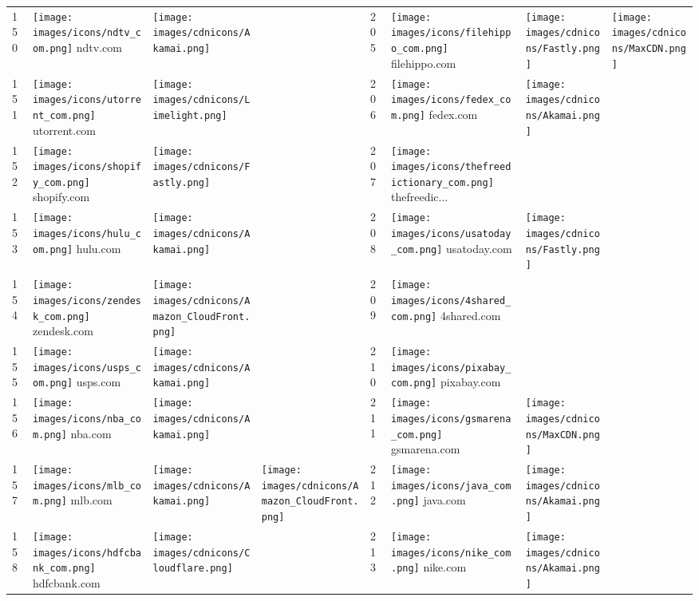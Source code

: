 \begin{table}[tbp]
\begin{tabular}{|llll|llll|}
150 & \texttt{[image: images/icons/ndtv\_com.png]} ndtv.com & \texttt{[image: images/cdnicons/Akamai.png]} & & 205 & \texttt{[image: images/icons/filehippo\_com.png]} filehippo.com & \texttt{[image: images/cdnicons/Fastly.png]} & \texttt{[image: images/cdnicons/MaxCDN.png]} \\
151 & \texttt{[image: images/icons/utorrent\_com.png]} utorrent.com & \texttt{[image: images/cdnicons/Limelight.png]} & & 206 & \texttt{[image: images/icons/fedex\_com.png]} fedex.com & \texttt{[image: images/cdnicons/Akamai.png]} & \\
152 & \texttt{[image: images/icons/shopify\_com.png]} shopify.com & \texttt{[image: images/cdnicons/Fastly.png]} & & 207 & \texttt{[image: images/icons/thefreedictionary\_com.png]} thefreedic... & & \\
153 & \texttt{[image: images/icons/hulu\_com.png]} hulu.com & \texttt{[image: images/cdnicons/Akamai.png]} & & 208 & \texttt{[image: images/icons/usatoday\_com.png]} usatoday.com & \texttt{[image: images/cdnicons/Fastly.png]} & \\
154 & \texttt{[image: images/icons/zendesk\_com.png]} zendesk.com & \texttt{[image: images/cdnicons/Amazon\_CloudFront.png]} & & 209 & \texttt{[image: images/icons/4shared\_com.png]} 4shared.com & & \\
155 & \texttt{[image: images/icons/usps\_com.png]} usps.com & \texttt{[image: images/cdnicons/Akamai.png]} & & 210 & \texttt{[image: images/icons/pixabay\_com.png]} pixabay.com & & \\
156 & \texttt{[image: images/icons/nba\_com.png]} nba.com & \texttt{[image: images/cdnicons/Akamai.png]} & & 211 & \texttt{[image: images/icons/gsmarena\_com.png]} gsmarena.com & \texttt{[image: images/cdnicons/MaxCDN.png]} & \\
157 & \texttt{[image: images/icons/mlb\_com.png]} mlb.com & \texttt{[image: images/cdnicons/Akamai.png]} & \texttt{[image: images/cdnicons/Amazon\_CloudFront.png]} & 212 & \texttt{[image: images/icons/java\_com.png]} java.com & \texttt{[image: images/cdnicons/Akamai.png]} & \\
158 & \texttt{[image: images/icons/hdfcbank\_com.png]} hdfcbank.com & \texttt{[image: images/cdnicons/Cloudflare.png]} & & 213 & \texttt{[image: images/icons/nike\_com.png]} nike.com & \texttt{[image: images/cdnicons/Akamai.png]} & \\

\end{tabular}
\end{table}
